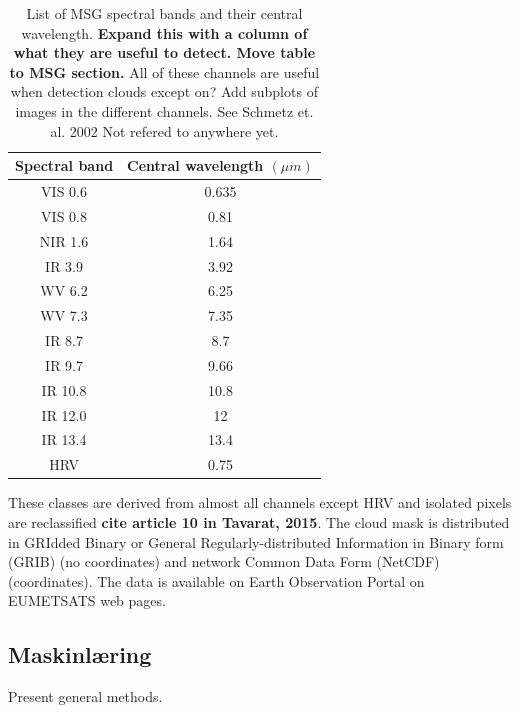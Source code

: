\begin{table}[]
    \centering
    \begin{tabular}{c|c}
        Spectral band & Central wavelength $\left( \mu m  \right)$ \\ \hline
        VIS 0.6 & 0.635 \\
        VIS 0.8 & 0.81 \\
        NIR 1.6 & 1.64 \\
        IR 3.9 & 3.92 \\
        WV 6.2 & 6.25 \\
        WV 7.3 & 7.35 \\ 
        IR 8.7 & 8.7 \\
        IR 9.7 & 9.66 \\
        IR 10.8 & 10.8 \\
        IR 12.0 & 12 \\
        IR 13.4 & 13.4 \\
        HRV & 0.75
    \end{tabular}
    \caption{List of MSG spectral bands and their central wavelength. \textbf{Expand this with a column of what they are useful to detect. Move table to MSG section. } All of these channels are useful when detection clouds except on? Add subplots of images in the different channels. See Schmetz et. al. 2002  Not refered to anywhere yet.}
    \label{tab:msg_spectral_bands}
\end{table}
These classes are derived from almost all channels except HRV and isolated pixels are reclassified \textbf{cite article 10 in Tavarat, 2015}. The cloud mask is distributed in GRIdded Binary or General Regularly-distributed Information in Binary form (GRIB) (no coordinates) and network Common Data Form (NetCDF) (coordinates). The data is available on Earth Observation Portal on EUMETSATS web pages. 

\subsection{Maskinlæring}
Present general methods.

